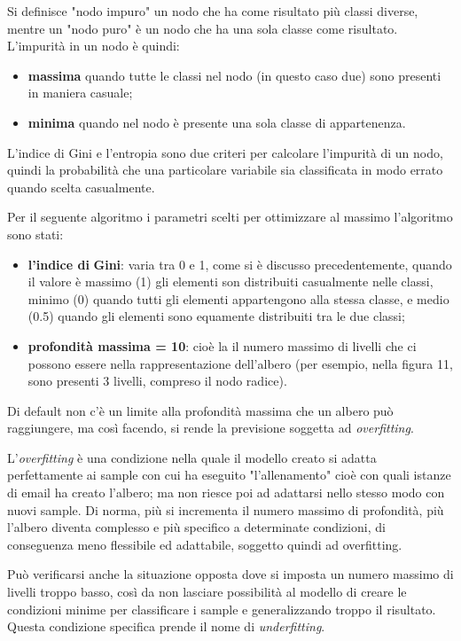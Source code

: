 \documentclass[12pt,a4paper]{article}
\begin{document}
Si definisce "nodo impuro" un nodo che ha come risultato più classi diverse, mentre un "nodo puro" è un nodo che ha una sola classe come risultato.
L'impurità in un nodo è quindi:
\begin{itemize}
    \item \textbf{massima} quando tutte le classi nel nodo (in questo caso due) sono presenti in maniera casuale;
    \item \textbf{minima} quando nel nodo è presente una sola classe di appartenenza.
\end{itemize}
L'indice di Gini e l'entropia sono due criteri per calcolare l'impurità di un nodo, quindi la probabilità che una particolare variabile sia classificata in modo errato quando scelta casualmente.

Per il seguente algoritmo i parametri scelti per ottimizzare al massimo l'algoritmo sono stati:
\begin{itemize}
    \item \textbf{l'indice di}\textbf{ Gini}: varia tra 0 e 1, come si è discusso precedentemente, quando il valore è massimo (1) gli elementi son distribuiti casualmente nelle classi, minimo (0) quando tutti gli elementi appartengono alla stessa classe, e medio (0.5) quando gli elementi sono equamente distribuiti tra le due classi;
    \item \textbf{profondità massima = 10}: cioè la il numero massimo di livelli che ci possono essere nella rappresentazione dell'albero (per esempio, nella figura 11, sono presenti 3 livelli, compreso il nodo radice).
\end{itemize}

Di default non c'è un limite alla profondità massima che un albero può raggiungere, ma così facendo, si rende la previsione soggetta ad \textit{overfitting}.

L'\textit{overfitting} è una condizione nella quale il modello creato si adatta perfettamente ai sample con cui ha eseguito "l'allenamento" cioè con quali istanze di email ha creato l'albero; ma non riesce poi ad adattarsi nello stesso modo con nuovi sample.
Di norma, più si incrementa il numero massimo di profondità, più l'albero diventa complesso e più specifico a determinate condizioni, di conseguenza meno flessibile ed adattabile, soggetto quindi ad overfitting.

Può verificarsi anche la situazione opposta dove si imposta un numero massimo di livelli troppo basso, così da non lasciare possibilità al modello di creare le condizioni minime per classificare i sample e generalizzando troppo il risultato. Questa condizione specifica prende il nome di \textit{underfitting}.
\end{document}
